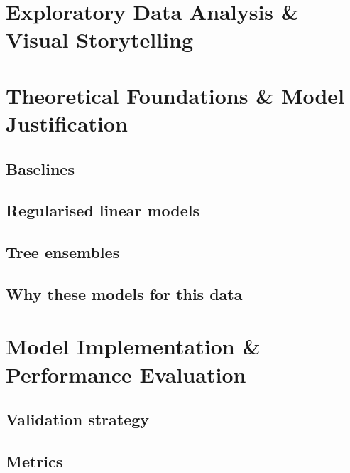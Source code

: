 \documentclass[11pt,a4paper]{article}
\begin{document}
\section{Exploratory Data Analysis \& Visual Storytelling}

\section{Theoretical Foundations \& Model Justification}
\subsection{Baselines}  %
\subsection{Regularised linear models} %
\subsection{Tree ensembles}            %
\subsection{Why these models for this data} %

\section{Model Implementation \& Performance Evaluation}
\subsection{Validation strategy} %
\subsection{Metrics}             %
\end{document}
